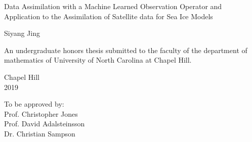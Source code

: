 \begin{titlepage}
\begin{center}


\vspace{2in}
\begin{singlespace}
\Large \bf

Data Assimilation with a Machine Learned Observation Operator and \\
Application to the Assimilation of Satellite data for Sea Ice Models
\end{singlespace}


\vspace{61pt} %
\large Siyang Jing
\end{center}



\vspace{50pt}
\begin{singlespace}
\noindent \large
An undergraduate honors thesis submitted to the faculty of the department of mathematics of University of North Carolina at Chapel Hill.
\end{singlespace}


\vspace{50pt}
\begin{center}
\begin{singlespace} \large
Chapel Hill\\
2019
\end{singlespace}
\end{center}


\vfill
\begin{flushright}
\begin{minipage}[t]{2.2in} \large
To be approved by: \\
Prof. Christopher Jones \\
Prof. David Adalsteinsson \\
Dr. Christian Sampson \\
\end{minipage}
\end{flushright}

\end{titlepage}